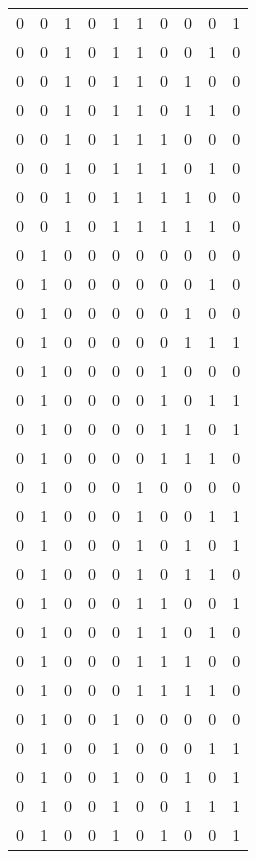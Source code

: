 \begin{longtable}[c]{rrrrrrrrrr}
        0 & 0 & 1 & 0 & 1 & 1 & 0 & 0 & 0 & 1 \\
        0 & 0 & 1 & 0 & 1 & 1 & 0 & 0 & 1 & 0 \\
        0 & 0 & 1 & 0 & 1 & 1 & 0 & 1 & 0 & 0 \\
        0 & 0 & 1 & 0 & 1 & 1 & 0 & 1 & 1 & 0 \\
        0 & 0 & 1 & 0 & 1 & 1 & 1 & 0 & 0 & 0 \\
        0 & 0 & 1 & 0 & 1 & 1 & 1 & 0 & 1 & 0 \\
        0 & 0 & 1 & 0 & 1 & 1 & 1 & 1 & 0 & 0 \\
        0 & 0 & 1 & 0 & 1 & 1 & 1 & 1 & 1 & 0 \\
        0 & 1 & 0 & 0 & 0 & 0 & 0 & 0 & 0 & 0 \\
        0 & 1 & 0 & 0 & 0 & 0 & 0 & 0 & 1 & 0 \\
        0 & 1 & 0 & 0 & 0 & 0 & 0 & 1 & 0 & 0 \\
        0 & 1 & 0 & 0 & 0 & 0 & 0 & 1 & 1 & 1 \\
        0 & 1 & 0 & 0 & 0 & 0 & 1 & 0 & 0 & 0 \\
        0 & 1 & 0 & 0 & 0 & 0 & 1 & 0 & 1 & 1 \\
        0 & 1 & 0 & 0 & 0 & 0 & 1 & 1 & 0 & 1 \\
        0 & 1 & 0 & 0 & 0 & 0 & 1 & 1 & 1 & 0 \\
        0 & 1 & 0 & 0 & 0 & 1 & 0 & 0 & 0 & 0 \\
        0 & 1 & 0 & 0 & 0 & 1 & 0 & 0 & 1 & 1 \\
        0 & 1 & 0 & 0 & 0 & 1 & 0 & 1 & 0 & 1 \\
        0 & 1 & 0 & 0 & 0 & 1 & 0 & 1 & 1 & 0 \\
        0 & 1 & 0 & 0 & 0 & 1 & 1 & 0 & 0 & 1 \\
        0 & 1 & 0 & 0 & 0 & 1 & 1 & 0 & 1 & 0 \\
        0 & 1 & 0 & 0 & 0 & 1 & 1 & 1 & 0 & 0 \\
        0 & 1 & 0 & 0 & 0 & 1 & 1 & 1 & 1 & 0 \\
        0 & 1 & 0 & 0 & 1 & 0 & 0 & 0 & 0 & 0 \\
        0 & 1 & 0 & 0 & 1 & 0 & 0 & 0 & 1 & 1 \\
        0 & 1 & 0 & 0 & 1 & 0 & 0 & 1 & 0 & 1 \\
        0 & 1 & 0 & 0 & 1 & 0 & 0 & 1 & 1 & 1 \\
        0 & 1 & 0 & 0 & 1 & 0 & 1 & 0 & 0 & 1 \\

\end{longtable}
